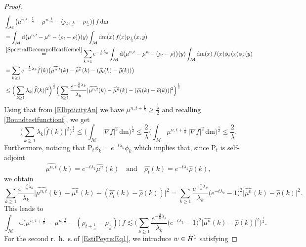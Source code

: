 \documentclass[11pt,a4paper,oneside]{amsart}
\numberwithin{equation}{section}
\newcommand{\dd}{\mathrm{d}}
\newcommand{\rhs}{r.~h.~s.\,}
\newcommand{\pp}{\mathrm{P}}
\newcommand{\m}{\mathrm{m}}
\begin{document}
\begin{proof}
\begin{align*}
%
&\int_{\mathcal{M}}\big(\mu^{n,t+\frac{1}{n}}-\mu^{n,\frac{1}{n}}-(\rho_{t+\frac{1}{n}}-\rho_{\frac{1}{n}})\big)\, f\,\dd\m\\
&=\int_{\mathcal{M}}\dd\big(\mu^{n,t}-\mu^{n}-(\rho_{t}-\rho)\big)(y)\int_{\mathcal{M}}\dd\m(x)\,f(x)p_{\frac{1}{n}}(x,y)\\
&\stackrel{\eqref{SpectralDecompoHeatKernel}}{=}\sum_{k\geq 1}e^{-\frac{1}{n}\lambda_k}\int_{\mathcal{M}}\dd\big(\mu^{n,t}-\mu^{n}-(\rho_{t}-\rho)\big)(y)\int_{\mathcal{M}}\dd\m(x)\,f(x)\phi_k(x)\phi_k(y)\\
&=\sum_{k\geq 1}e^{-\frac{1}{n}\lambda_k}\widehat{f}(k)\big(\widehat{\mu^{n,t}}(k)-\widehat{\mu^{n}}(k)-(\widehat{\rho_t}(k)-\widehat{\rho}(k))\big)\\
&\leq \Big(\sum_{k\geq 1}\lambda_k\vert\widehat{f}(k)\vert^2\Big)^{\frac{1}{2}}\Big(\sum_{k\geq 1}\frac{e^{-\frac{2}{n}\lambda_k}}{\lambda_k}\vert \widehat{\mu^{n,t}}(k)-\widehat{\mu^{n}}(k)-(\widehat{\rho_t}(k)-\widehat{\rho}(k))\vert^2\Big)^{\frac{1}{2}}
%
\end{align*}
%
Using that from \eqref{EllipticityAn} we have $\mu^{n,t+\frac{1}{n}}\geq \frac{\lambda}{2}$ and recalling \eqref{Boundtestfunctionf}, we get
%
$$ \Big(\sum_{k\geq 1}\lambda_k\vert\widehat{f}(k)\vert^2\Big)^{\frac{1}{2}}\leq \Big(\int_{\mathcal{M}}\vert \nabla f\vert^2\,\dd\m\Big)^{\frac{1}{2}}\leq \frac{2}{\lambda}\Big(\int_{\mathcal{M}}\mu^{n,t+\frac{1}{n}}\, \vert \nabla f\vert^2\,\dd\m\Big)^{\frac{1}{2}}\leq \frac{2}{\lambda}.$$
%
Furthermore, noticing that $\pp_t\phi_k=e^{-t\lambda_k}\phi_k$ which implies that, since $\pp_t$ is self-adjoint
%
$$\widehat{\mu^{n,t}}(k)=e^{-t\lambda_k}\widehat{\mu^n}(k)\quad\text{and}\quad \widehat{\rho_t}(k)=e^{-t\lambda_k}\widehat{\rho}(k),$$
%
we obtain
%
$$\sum_{k\geq 1}\frac{e^{-\frac{2}{n}\lambda_k}}{\lambda_k}\vert \widehat{\mu^{n,t}}(k)-\widehat{\mu^{n}}(k)-(\widehat{\rho_t}(k)-\widehat{\rho}(k))\vert^2=\sum_{k\geq 1}\frac{e^{-\frac{2}{n}\lambda_k}}{\lambda_k}\big(e^{-t\lambda_k}-1\big)^2\vert\widehat{\mu^n}(k)-\widehat{\rho}(k)\vert^2.$$
%
This leads to 
%
\begin{equation}\label{EstiPeyre:Eq2}
%
\int_{\mathcal{M}}\dd\big(\mu^{n,t+\frac{1}{n}}-\mu^{n,\frac{1}{n}}-(\rho_{t+\frac{1}{n}}-\rho_{\frac{1}{n}})\big)\, f\lesssim \Big(\sum_{k\geq 1}\frac{e^{-\frac{2}{n}\lambda_k}}{\lambda_k}\big(e^{-t\lambda_k}-1\big)^2\vert\widehat{\mu^n}(k)-\widehat{\rho}(k)\vert^2\Big)^{\frac{1}{2}}.
%
\end{equation}
%
For the second \rhs of \eqref{EstiPeyre:Eq1}, we introduce $w\in \dot{{\rm H}}^1$ satisfying 

\end{proof}
\end{document}
